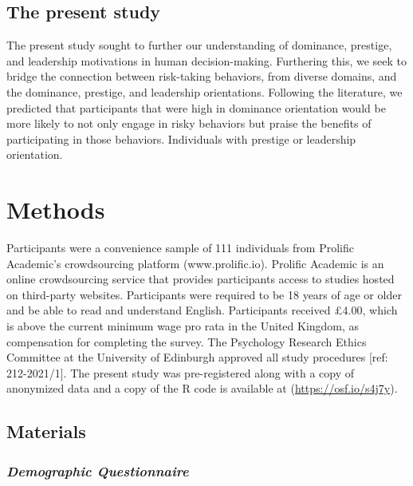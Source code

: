 \documentclass[
  english,
  a4paper,floatsintext]{apa7}
\begin{document}
\hypertarget{the-present-study}{%
\subsection{The present study}\label{the-present-study}}

The present study sought to further our understanding of dominance, prestige, and leadership motivations in human decision-making. Furthering this, we seek to bridge the connection between risk-taking behaviors, from diverse domains, and the dominance, prestige, and leadership orientations. Following the literature, we predicted that participants that were high in dominance orientation would be more likely to not only engage in risky behaviors but praise the benefits of participating in those behaviors. Individuals with prestige or leadership orientation.

\hypertarget{methods}{%
\section{Methods}\label{methods}}

Participants were a convenience sample of 111 individuals from Prolific Academic's crowdsourcing platform (www.prolific.io). Prolific Academic is an online crowdsourcing service that provides participants access to studies hosted on third-party websites. Participants were required to be 18 years of age or older and be able to read and understand English. Participants received £4.00, which is above the current minimum wage pro rata in the United Kingdom, as compensation for completing the survey. The Psychology Research Ethics Committee at the University of Edinburgh approved all study procedures {[}ref: 212-2021/1{]}. The present study was pre-registered along with a copy of anonymized data and a copy of the R code is available at (\url{https://osf.io/s4j7y}).

\hypertarget{materials}{%
\subsection{Materials}\label{materials}}

\hypertarget{demographic-questionnaire}{%
\subsubsection{\texorpdfstring{\emph{Demographic Questionnaire}}{Demographic Questionnaire}}\label{demographic-questionnaire}}
\end{document}
